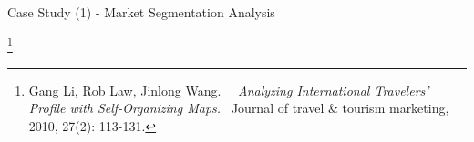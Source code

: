 \documentclass[
 size=14pt,
 paper=smartboard,  %
 mode=present, 		%
 display=slides, 	%
 style=tuliplab,  	%
 pauseslide,
 fleqn,leqno]{powerdot}
\begin{document}
\begin{slide}[toc=,bm=]{Case Study (1) - Market Segmentation Analysis}

\begin{figure}[htbp]
\end{figure}


\footnote{Gang Li, Rob Law, Jinlong Wang.  
\emph{Analyzing International Travelers' Profile with Self-Organizing Maps. }
Journal of travel \& tourism marketing, 2010, 27(2): 113-131.
}
\end{slide}
\end{document}
